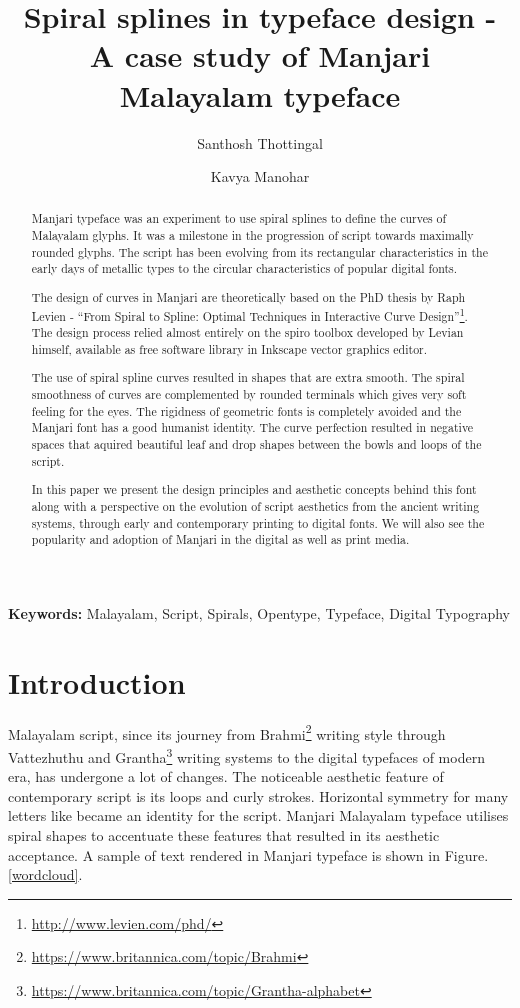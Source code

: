 \documentclass[10pt]{article}
\title{Spiral splines in typeface design - A case study of Manjari Malayalam typeface}
\author{ 
 Santhosh Thottingal
  \and
 Kavya Manohar
}
\begin{document}
\maketitle

\begin{abstract}

Manjari typeface was an experiment to use spiral splines to define the curves of Malayalam glyphs. It was a milestone in the progression of script towards maximally rounded glyphs. The script has been evolving from its rectangular characteristics in the early days of metallic types to the circular characteristics of popular digital fonts. 

The design of curves in Manjari are theoretically based on the PhD thesis by Raph Levien - “From Spiral to Spline: Optimal Techniques in Interactive Curve Design”\footnote{\url{http://www.levien.com/phd/}}. The design process relied almost entirely on the spiro toolbox developed  by Levian himself, available as free software library in Inkscape vector graphics editor.

The use of spiral spline curves resulted in shapes that are extra smooth. The spiral smoothness of curves are complemented by rounded terminals which gives very soft feeling for the eyes. The rigidness of geometric fonts is completely avoided and  the Manjari font has a good humanist identity. The curve perfection resulted in negative spaces that aquired beautiful leaf and drop shapes between the bowls and loops of the script. 

In this paper we present the design principles and aesthetic concepts behind this font along with a perspective on the evolution of script aesthetics from the ancient writing systems, through early and contemporary printing to digital fonts. We will also see the popularity and adoption of Manjari in the digital as well as print media.
\end{abstract}
 \textbf{Keywords:} Malayalam, Script, Spirals, Opentype, Typeface, Digital Typography

\section{Introduction}

Malayalam script, since its journey from Brahmi\footnote{\url{https://www.britannica.com/topic/Brahmi}} writing style through Vattezhuthu and Grantha\footnote{\url{https://www.britannica.com/topic/Grantha-alphabet}} writing systems to the digital typefaces of modern era, has undergone a lot of changes. The noticeable aesthetic feature of contemporary script is its loops and curly strokes. Horizontal symmetry for many letters like {} became an identity for the script. Manjari Malayalam typeface utilises spiral shapes to accentuate these features that resulted in its aesthetic acceptance. A sample of text rendered in Manjari typeface is shown in Figure. \ref{wordcloud}. 
\end{document}
